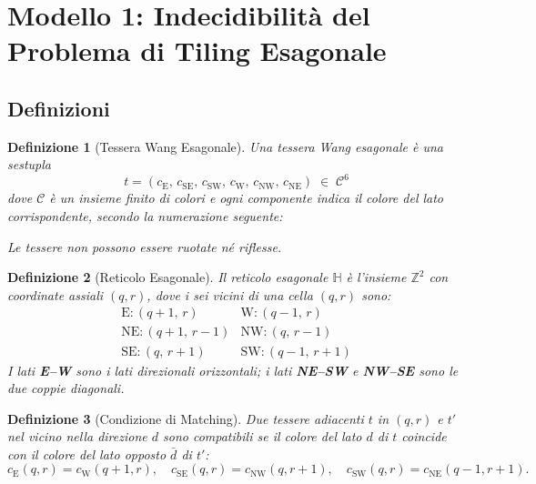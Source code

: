 \documentclass[12pt, a4paper]{article}
\newtheorem{definizione}{Definizione}
\newcommand{\edgeE}{c_{\mathrm{E}}}
\newcommand{\edgeSE}{c_{\mathrm{SE}}}
\newcommand{\edgeSW}{c_{\mathrm{SW}}}
\newcommand{\edgeW}{c_{\mathrm{W}}}
\newcommand{\edgeNW}{c_{\mathrm{NW}}}
\newcommand{\edgeNE}{c_{\mathrm{NE}}}
\begin{document}
\section{Modello 1: Indecidibilità del Problema di Tiling Esagonale}

\subsection{Definizioni}

\begin{definizione}[Tessera Wang Esagonale]
Una \emph{tessera Wang esagonale} è una sestupla
\[
  t = (\edgeE,\, \edgeSE,\, \edgeSW,\, \edgeW,\, \edgeNW,\, \edgeNE) \;\in\; \mathcal{C}^6
\]
dove $\mathcal{C}$ è un insieme finito di \emph{colori} e ogni componente indica il colore
del lato corrispondente, secondo la numerazione seguente:
\begin{center}
\end{center}
Le tessere \emph{non} possono essere ruotate né riflesse.
\end{definizione}

\begin{definizione}[Reticolo Esagonale]
Il \emph{reticolo esagonale} $\mathbb{H}$ è l'insieme $\mathbb{Z}^2$ con coordinate assiali
$(q, r)$, dove i sei vicini di una cella $(q, r)$ sono:
\[
\begin{array}{ll}
  \mathrm{E}:   (q+1,\, r) &
  \mathrm{W}:   (q-1,\, r) \\[3pt]
  \mathrm{NE}: (q+1,\, r-1) &
  \mathrm{NW}: (q,\, r-1) \\[3pt]
  \mathrm{SE}: (q,\, r+1) &
  \mathrm{SW}: (q-1,\, r+1)
\end{array}
\]
I lati \textbf{E--W} sono i lati direzionali orizzontali;
i lati \textbf{NE--SW} e \textbf{NW--SE} sono le due coppie diagonali.
\end{definizione}

\begin{definizione}[Condizione di Matching]
Due tessere adiacenti $t$ in $(q,r)$ e $t'$ nel vicino nella direzione $d$ sono
\emph{compatibili} se il colore del lato $d$ di $t$ coincide con il colore del lato
opposto $\bar{d}$ di $t'$:
\[
  \edgeE(q,r)   = \edgeW(q+1,r), \quad
  \edgeSE(q,r)  = \edgeNW(q,r+1), \quad
  \edgeSW(q,r)  = \edgeNE(q-1,r+1).
\]
\end{definizione}
\end{document}
